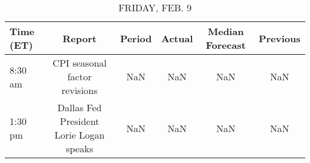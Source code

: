 \documentclass{article}%
\begin{document}
%


\begin{table}[htbp]%
\caption{FRIDAY, FEB. 9}%
\centering%
\begin{adjustbox}{width=1\textwidth}%
\begin{tabular}{lccccc}
\toprule
Time (ET) &                                  Report & Period & Actual & Median Forecast & Previous \\
\midrule
  8:30 am &           CPI seasonal factor revisions &    NaN &    NaN &             NaN &      NaN \\
  1:30 pm & Dallas Fed President Lorie Logan speaks &    NaN &    NaN &             NaN &      NaN \\
\bottomrule
\end{tabular}
%
\end{adjustbox}%
\end{table}
\end{document}
